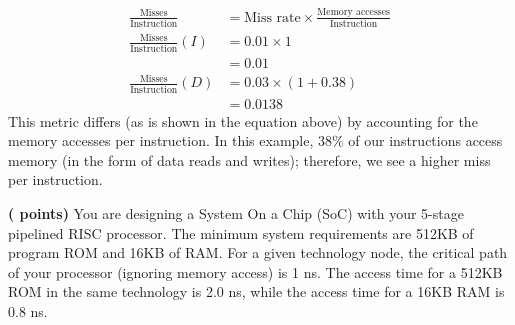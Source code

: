 \documentclass[addpoints,11pt]{exam}
\begin{document}
\begin{questions}
\begin{parts}
        \begin{tcolorbox}[colback=CrispBlue!5!white,colframe=CrispBlue!75!black,title=]\vspace{-1em}
            \begin{align*}
                \frac{\text{Misses}}{\text{Instruction}} &= \text{Miss rate} \times \frac{\text{Memory accesses}}{\text{Instruction}}\\[1em]
                \frac{\text{Misses}}{\text{Instruction}}(I) &=0.01 \times 1\\
                &=0.01\\
                \frac{\text{Misses}}{\text{Instruction}}(D) &=0.03 \times (1+0.38)\\
                &=0.0138
            \end{align*}
            This metric differs (as is shown in the equation above) by accounting for the memory accesses per instruction. In this example, 38\% of our instructions access memory (in the form of data reads and writes); therefore, we see a higher miss per instruction.
        \end{tcolorbox}
    \end{parts}
\newpage

\question\textbf{( points)} %
You are designing a System On a Chip (SoC) with your 5-stage pipelined RISC processor. The minimum system requirements are 512KB of program ROM and 16KB of RAM. For a given technology node, the critical path of your processor (ignoring memory access) is 1 ns. The access time for a 512KB ROM in the same technology is 2.0 ns, while the access time for a 16KB RAM is 0.8 ns.
\end{questions}
\end{document}

